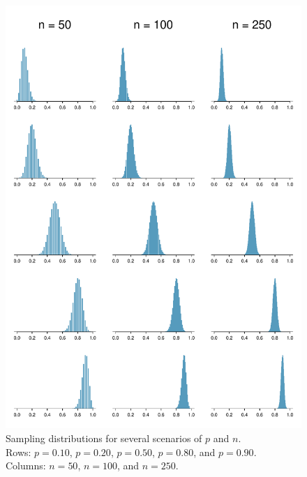 \begin{figure}
   \centering
   \includegraphics[width=\textwidth]{ch_foundations_for_inf/figures/clt_prop_grid/clt_prop_grid_2}
   \caption{Sampling distributions for several scenarios
       of $p$ and $n$. \\
       Rows: $p = 0.10$, $p = 0.20$, $p = 0.50$,
       $p = 0.80$, and $p = 0.90$. \\
       Columns: $n = 50$, $n = 100$, and $n = 250$.}
   \label{clt_prop_grid_2}
\end{figure}

